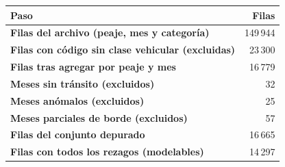 \renewcommand{\arraystretch}{1.2}
\begin{tabular}{|l|r|}
\hline
\rowcolor{gray!20} \textbf{Paso} & \textbf{Filas} \\
\hline
\textbf{Filas del archivo (peaje, mes y categoría)} & 149\,944 \\
\hline
\textbf{Filas con código sin clase vehicular (excluidas)} & 23\,300 \\
\hline
\textbf{Filas tras agregar por peaje y mes} & 16\,779 \\
\hline
\textbf{Meses sin tránsito (excluidos)} & 32 \\
\hline
\textbf{Meses anómalos (excluidos)} & 25 \\
\hline
\textbf{Meses parciales de borde (excluidos)} & 57 \\
\hline
\textbf{Filas del conjunto depurado} & 16\,665 \\
\hline
\textbf{Filas con todos los rezagos (modelables)} & 14\,297 \\
\hline
\end{tabular}
